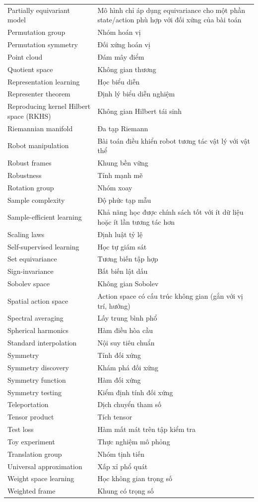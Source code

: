 \documentclass[oneside]{hcmus-report}
\theoremstyle{plain}
\theoremstyle{definition}
\begin{document}
\begin{longtable}{p{} p{}}
Partially equivariant model & Mô hình chỉ áp dụng equivariance cho một phần state/action phù hợp với đối xứng của bài toán \\
Permutation group & Nhóm hoán vị \\
Permutation symmetry & Đối xứng hoán vị \\
Point cloud & Đám mây điểm \\
Quotient space & Không gian thương \\
Representation learning & Học biểu diễn \\
Representer theorem & Định lý biểu diễn nghiệm \\
Reproducing kernel Hilbert space (RKHS) & Không gian Hilbert tái sinh \\
Riemannian manifold & Đa tạp Riemann \\
Robot manipulation & Bài toán điều khiển robot tương tác vật lý với vật thể \\
Robust frames & Khung bền vững \\
Robustness & Tính mạnh mẽ \\
Rotation group & Nhóm xoay \\
Sample complexity & Độ phức tạp mẫu \\
Sample-efficient learning & Khả năng học được chính sách tốt với ít dữ liệu hoặc ít lần tương tác hơn \\
Scaling laws & Định luật tỷ lệ \\
Self-supervised learning & Học tự giám sát \\
Set equivariance & Tương biến tập hợp \\
Sign-invariance & Bất biến lật dấu \\
Sobolev space & Không gian Sobolev \\
Spatial action space & Action space có cấu trúc không gian (gắn với vị trí, hướng) \\
Spectral averaging & Lấy trung bình phổ \\
Spherical harmonics & Hàm điều hòa cầu \\
Standard interpolation & Nội suy tiêu chuẩn \\
Symmetry & Tính đối xứng \\
Symmetry discovery & Khám phá đối xứng \\
Symmetry function & Hàm đối xứng \\
Symmetry testing & Kiểm định tính đối xứng \\
Teleportation & Dịch chuyển tham số \\
Tensor product & Tích tensor \\
Test loss & Hàm mất mát trên tập kiểm tra \\
Toy experiment & Thực nghiệm mô phỏng \\
Translation group & Nhóm tịnh tiến \\
Universal approximation & Xấp xỉ phổ quát \\
Weight space learning & Học không gian trọng số \\
Weighted frame & Khung có trọng số \\

\end{longtable}
\clearpage
\end{document}
